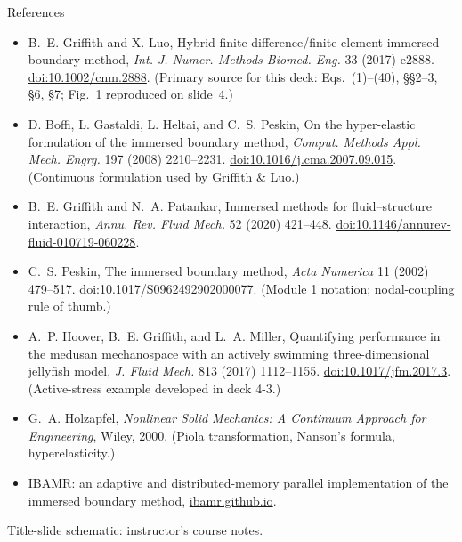 \documentclass[aspectratio=169,11pt]{beamer}
\begin{document}
\begin{frame}{References}
\scriptsize
\begin{itemize}\itemsep3pt
  \item B.~E. Griffith and X. Luo, Hybrid finite difference/finite element immersed boundary method, \emph{Int. J. Numer. Methods Biomed. Eng.} 33 (2017) e2888. \href{https://doi.org/10.1002/cnm.2888}{doi:10.1002/cnm.2888}. (Primary source for this deck: Eqs.~(1)--(40), \S\S2--3, \S6, \S7; Fig.~1 reproduced on slide~4.)
  \item D. Boffi, L. Gastaldi, L. Heltai, and C.~S. Peskin, On the hyper-elastic formulation of the immersed boundary method, \emph{Comput. Methods Appl. Mech. Engrg.} 197 (2008) 2210--2231. \href{https://doi.org/10.1016/j.cma.2007.09.015}{doi:10.1016/j.cma.2007.09.015}. (Continuous formulation used by Griffith \& Luo.)
  \item B.~E. Griffith and N.~A. Patankar, Immersed methods for fluid--structure interaction, \emph{Annu. Rev. Fluid Mech.} 52 (2020) 421--448. \href{https://doi.org/10.1146/annurev-fluid-010719-060228}{doi:10.1146/annurev-fluid-010719-060228}.
  \item C.~S. Peskin, The immersed boundary method, \emph{Acta Numerica} 11 (2002) 479--517. \href{https://doi.org/10.1017/S0962492902000077}{doi:10.1017/S0962492902000077}. (Module 1 notation; nodal-coupling rule of thumb.)
  \item A.~P. Hoover, B.~E. Griffith, and L.~A. Miller, Quantifying performance in the medusan mechanospace with an actively swimming three-dimensional jellyfish model, \emph{J. Fluid Mech.} 813 (2017) 1112--1155. \href{https://doi.org/10.1017/jfm.2017.3}{doi:10.1017/jfm.2017.3}. (Active-stress example developed in deck 4-3.)
  \item G.~A. Holzapfel, \emph{Nonlinear Solid Mechanics: A Continuum Approach for Engineering}, Wiley, 2000. (Piola transformation, Nanson's formula, hyperelasticity.)
  \item IBAMR: an adaptive and distributed-memory parallel implementation of the immersed boundary method, \href{https://ibamr.github.io/}{ibamr.github.io}.
\end{itemize}
\medskip
{\tiny\color{DarkGray}Title-slide schematic: instructor's course notes. \aidisclosure\par}
\end{frame}
\end{document}
